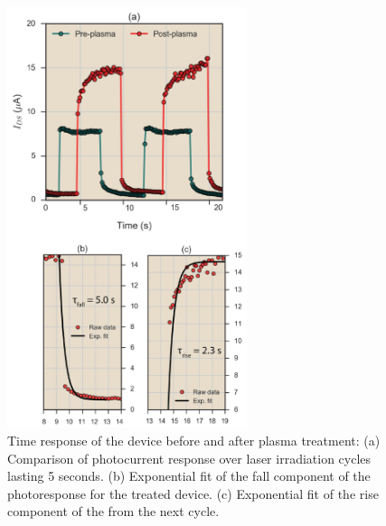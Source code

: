 \documentclass[%
 reprint,
superscriptaddress,
 amsmath,amssymb,
 aps,
prb,
]{revtex4-1}
\begin{document}
\begin{center}
\begin{figure}[!htb]
\includegraphics[width=70mm]{Time_response_fig}
\caption{Time response of the device before and after plasma treatment: (a) Comparison of photocurrent response over laser irradiation cycles lasting 5 seconds. (b) Exponential fit of the fall component of the photoresponse for the treated device. (c) Exponential fit of the rise component of the from the next cycle.}
\end{figure}
\end{center}
\end{document}
